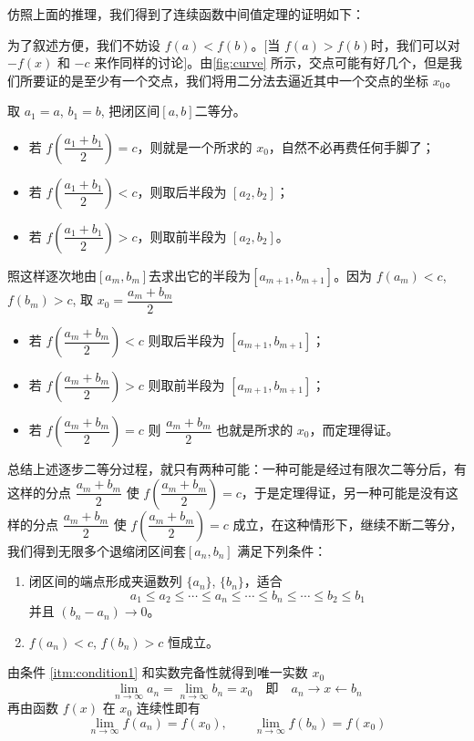 \medskip
仿照上面的推理，我们得到了连续函数中间值定理的证明如下：

为了叙述方便，我们不妨设 $f(a)<f(b)$。$\big[$当 $f(a)>f(b)$时，我们可以对 $-f(x)$ 和 $-c$ 来作同样的讨论$\big]$。由\cref{fig:curve} 所示，交点可能有好几个，但是我们所要证的是至少有一个交点，我们将用二分法去逼近其中一个交点的坐标 $x_0$。

取 $a_1=a$, $b_1=b$, 把闭区间$[a,b]$二等分。
\begin{itemize}[itemsep=5pt]
  \item 若 $f\left(\dfrac{a_1+b_1}{2}\right)=c$，则就是一个所求的 $x_0$，自然不必再费任何手脚了；
  \item 若 $f\left(\dfrac{a_1+b_1}{2}\right)<c$，则取后半段为 $[a_2,b_2]$；
  \item 若 $f\left(\dfrac{a_1+b_1}{2}\right)>c$，则取前半段为 $[a_2,b_2]$。
\end{itemize}
照这样逐次地由$[a_m,b_m]$去求出它的半段为$[a_{m+1},b_{m+1}]$。因为 $f(a_m)<c$, $f(b_m)>c$, 取 $x_0=\dfrac{a_m+b_m}{2}$
\begin{itemize}[itemsep=5pt]
  \item 若 $f\left(\dfrac{a_m+b_m}{2}\right)<c$ 则取后半段为 $[a_{m+1},b_{m+1}]$；
  \item 若 $f\left(\dfrac{a_m+b_m}{2}\right)>c$ 则取前半段为 $[a_{m+1},b_{m+1}]$；
  \item 若 $f\left(\dfrac{a_m+b_m}{2}\right)=c$ 则 $\dfrac{a_{m}+b_{m}}{2}$ 也就是所求的 $x_0$，而定理得证。
\end{itemize}

\bigskip
总结上述逐步二等分过程，就只有两种可能：一种可能是经过有限次二等分后，有这样的分点 $\dfrac{a_m+b_m}{2}$ 使 $f\left(\dfrac{a_m+b_m}{2}\right)=c$，于是定理得证，另一种可能是没有这样的分点 $\dfrac{a_m+b_m}{2}$ 使 $f\left(\dfrac{a_m+b_m}{2}\right)=c$ 成立，在这种情形下，继续不断二等分，我们得到无限多个退缩闭区间套$[a_n,b_n]$ 满足下列条件：

\begin{enumerate}
  \item\label{itm:condition1} 闭区间的端点形成夹逼数列 $\{a_n\}$, $\{b_n\}$，适合
    \[a_1\leqslant a_2\leqslant \cdots\leqslant a_n\leqslant \cdots \leqslant b_n\leqslant \cdots\leqslant b_2\leqslant b_1\]
并且 $(b_n-a_n)\to 0$。
  \item $f(a_n)<c$, $f(b_n)>c$ 恒成立。
\end{enumerate}

    由条件 \ref{itm:condition1} 和实数完备性就得到唯一实数 $x_0$
    \[\lim_{n\to\infty} a_n=\lim_{n\to\infty} b_n=x_0\quad \text{即}\quad a_n\to x\leftarrow b_n\]
    再由函数 $f(x)$ 在 $x_0$ 连续性即有
\[    \lim_{n\to\infty} f(a_n) = f(x_0),\qquad \lim_{n\to\infty} f(b_n)=f(x_0)\]

